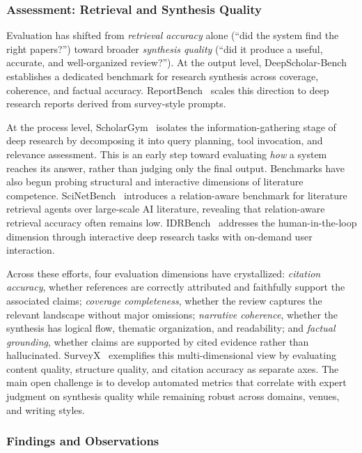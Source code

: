 \documentclass{llmxive}
\begin{document}
\subsubsection{Assessment: Retrieval and Synthesis Quality}
\label{sec:lit_eval}

Evaluation has shifted from \emph{retrieval accuracy} alone (``did the system find the right papers?'') toward broader \emph{synthesis quality} (``did it produce a useful, accurate, and well-organized review?''). At the output level, DeepScholar-Bench~\cite{deepscholar2025} establishes a dedicated benchmark for research synthesis across coverage, coherence, and factual accuracy. ReportBench~\cite{reportbench2025} scales this direction to deep research reports derived from survey-style prompts.

At the process level, ScholarGym~\cite{scholargym2026} isolates the information-gathering stage of deep research by decomposing it into query planning, tool invocation, and relevance assessment. This is an early step toward evaluating \emph{how} a system reaches its answer, rather than judging only the final output. Benchmarks have also begun probing structural and interactive dimensions of literature competence. SciNetBench~\cite{scinetbench2026} introduces a relation-aware benchmark for literature retrieval agents over large-scale AI literature, revealing that relation-aware retrieval accuracy often remains low. IDRBench~\cite{idrbench2026} addresses the human-in-the-loop dimension through interactive deep research tasks with on-demand user interaction.

Across these efforts, four evaluation dimensions have crystallized: \emph{citation accuracy}, whether references are correctly attributed and faithfully support the associated claims; \emph{coverage completeness}, whether the review captures the relevant landscape without major omissions; \emph{narrative coherence}, whether the synthesis has logical flow, thematic organization, and readability; and \emph{factual grounding}, whether claims are supported by cited evidence rather than hallucinated. SurveyX~\cite{liang2025surveyx} exemplifies this multi-dimensional view by evaluating content quality, structure quality, and citation accuracy as separate axes. The main open challenge is to develop automated metrics that correlate with expert judgment on synthesis quality while remaining robust across domains, venues, and writing styles.



\subsubsection{Findings and Observations}
\label{sec:s2_findings}
\end{document}
